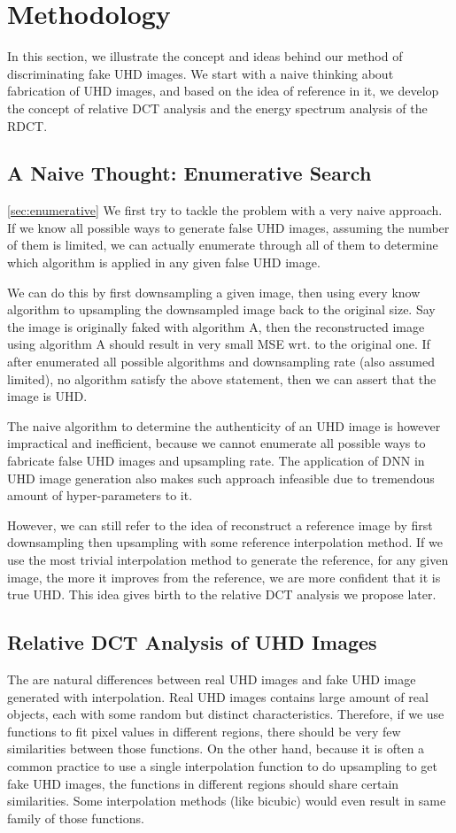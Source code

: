 \documentclass[journal,conference]{IEEEtran}
\begin{document}
\section{Methodology}
In this section, we illustrate the concept and ideas behind our method of discriminating fake UHD images.
We start with a naive thinking about fabrication of UHD images, and based on the idea of reference in it, we develop the concept of relative DCT analysis and the energy spectrum analysis of the RDCT.


\subsection{A Naive Thought: Enumerative Search}
\cref{sec:enumerative}
We first try to tackle the problem with a very naive approach.
If we know all possible ways to generate false UHD images, assuming the number of them is limited, we can actually enumerate through all of them to determine which algorithm is applied in any given false UHD image.

We can do this by first downsampling a given image, then using every know algorithm to upsampling the downsampled image back to the original size.
Say the image is originally faked with algorithm A, then the reconstructed image using algorithm A should result in very small MSE wrt. to the original one.
If after enumerated all possible algorithms and downsampling rate (also assumed limited), no algorithm satisfy the above statement, then we can assert that the image is UHD.

The naive algorithm to determine the authenticity of an UHD image is however impractical and inefficient, because we cannot enumerate all possible ways to fabricate false UHD images and upsampling rate.
The application of DNN in UHD image generation also makes such approach infeasible due to tremendous amount of hyper-parameters to it.

However, we can still refer to the idea of reconstruct a reference image by first downsampling then upsampling with some reference interpolation method.
If we use the most trivial interpolation method to generate the reference, for any given image, the more it improves from the reference, we are more confident that it is true UHD.
This idea gives birth to the relative DCT analysis we propose later.

\subsection{Relative DCT Analysis of UHD Images}
The are natural differences between real UHD images and fake UHD image generated with interpolation.
Real UHD images contains large amount of real objects, each with some random but distinct characteristics.
Therefore, if we use functions to fit pixel values in different regions, there should be very few similarities between those functions.
On the other hand, because it is often a common practice to use a single interpolation function to do upsampling to get fake UHD images, the functions in different regions should share certain similarities.
Some interpolation methods (like bicubic) would even result in same family of those functions.
\end{document}
